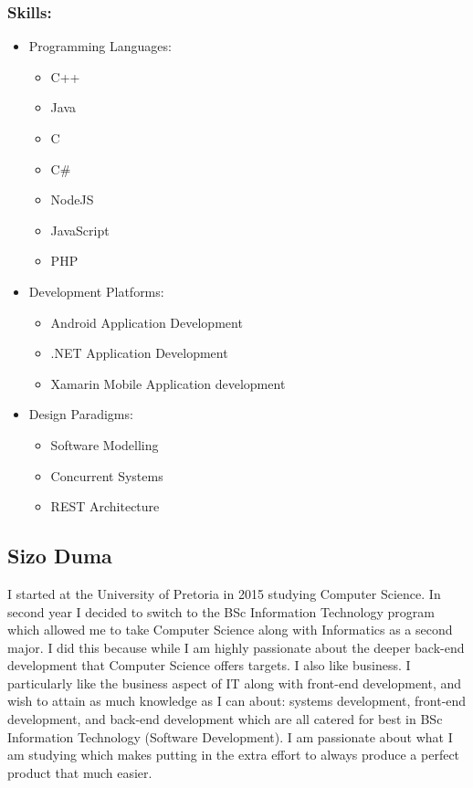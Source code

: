 \documentclass[12pt]{article}
\begin{document}
	\subsubsection{Skills:}
	\begin{itemize}
	\item Programming Languages:
	\begin{itemize}
	\item C++
	\item Java
	\item C
	\item C\#
	\item NodeJS
	\item JavaScript
	\item PHP
	\end{itemize}
	\item Development Platforms:
	\begin{itemize}
	\item Android Application Development
	\item .NET Application Development
	\item Xamarin Mobile Application development
	\end{itemize}
	\item Design Paradigms:
	\begin{itemize}
	\item Software Modelling
	\item Concurrent Systems
	\item REST Architecture
	\end{itemize}
	\end{itemize}
	
	\subsection{Sizo Duma}
	I started at the University of Pretoria in 2015 studying Computer Science. In second year I decided to switch to the BSc Information Technology program which allowed me to take Computer Science along with Informatics as a second major. I did this because while I am highly passionate about the deeper back-end development that Computer Science offers targets. I also like business. I particularly like the business aspect of IT along with front-end development, and wish to attain as much knowledge as I can about: systems development, front-end development, and back-end development which are all catered for best in BSc Information Technology (Software Development). I am passionate about what I am studying which makes putting in the extra effort to always produce a perfect product that much easier. 
\end{document}
